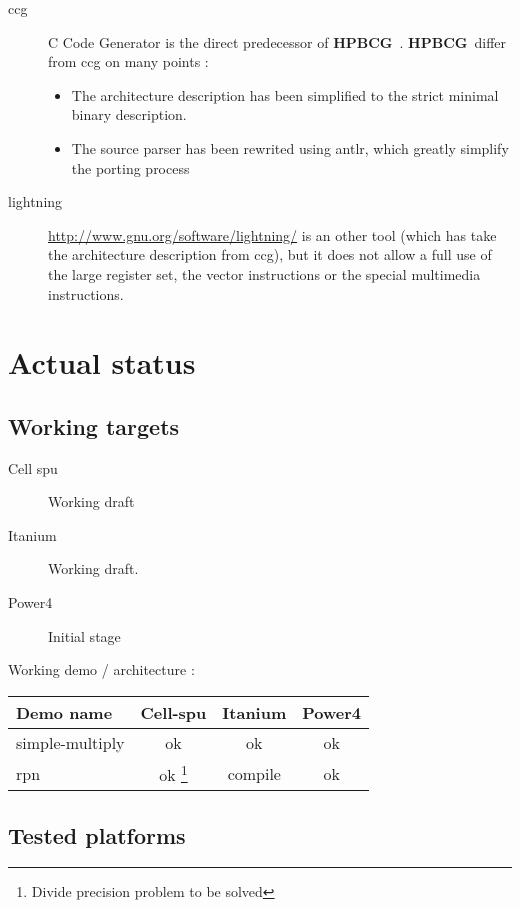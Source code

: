 \documentclass{article}
\newcommand{\hpbcg}{\textbf{HPBCG}\ }
\begin{document}
\begin{description}
\item[ccg] C Code Generator \cite{2001Piumarta} is the direct
  predecessor of \hpbcg. \hpbcg differ from ccg on many points :
  \begin{itemize}
  \item The architecture description has been simplified to the strict
    minimal binary description.
  \item The source parser has been rewrited using antlr, which greatly
    simplify the porting process
  \end{itemize}
\item[lightning] \url{http://www.gnu.org/software/lightning/} is an
  other tool (which has take the architecture description from ccg),
  but it does not allow a full use of the large register set, the
  vector instructions or the special multimedia instructions.
\end{description}

\section{Actual status}


\subsection{Working targets}

\begin{description}
\item[Cell spu] Working draft 
\item[Itanium]  Working draft.
\item[Power4]  Initial stage
\end{description}

Working demo / architecture :

\begin{tabular}{|l | c c c|} \hline
  Demo name       & Cell-spu & Itanium  & Power4\\ \hline
  simple-multiply & ok       & ok       & ok \\ \hline
  rpn             & ok \footnote{Divide precision problem to be solved}      & compile  & ok \\ \hline
\end{tabular}

\subsection{Tested platforms}
\end{document}
